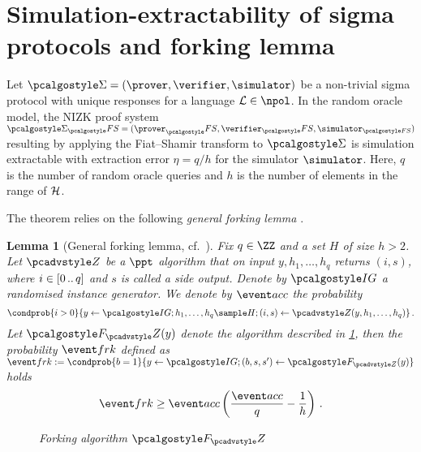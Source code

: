 \let\accentvec\vec \documentclass[runningheads]{llncs}
\newtheorem{lemma}[theorem]{Lemma}
\begin{document}
\section{Simulation-extractability of sigma protocols and forking lemma}
\label{sec:forking_lemma}
\begin{theorem}
	Let $\sigmaprot = (\prover, \verifier, \simulator)$ be a non-trivial sigma
  protocol with unique responses for a language $\LANG \in \npol$. In the random
  oracle model, the NIZK proof system $\sigmaprot_\fs = (\prover_\fs,
  \verifier_\fs, \simulator_{\fs})$ resulting by applying the Fiat--Shamir
  transform to $\sigmaprot$ is simulation extractable with extraction error
  $\eta = q/h$ for the simulator $\simulator$. Here, $q$ is the number of random
  oracle queries and $h$ is the number of elements in the range of $\mathcal{H}$.
\end{theorem}

The theorem relies on the following \emph{general forking lemma} \cite{JC:PoiSte00}.

\begin{lemma}[General forking lemma, cf.~\cite{INDOCRYPT:FKMV12,CCS:BelNev06}]
	\label{lem:forking_lemma}
	Fix $q \in \ZZ$ and a set $H$ of size $h > 2$. Let $\zdv$ be a $\ppt$
  algorithm that on input $y, h_1, \ldots, h_q$ returns $(i, s)$, where $i
  \in[0 \, .. \, q]$ and $s$ is called a \emph{side output}. Denote by $\ig$ a
  randomised instance generator. We denote by $\accProb$ the probability
	\[
		\condprob{i > 0}{y \gets \ig; h_1, \ldots, h_q \sample H; (i, s) \gets
		\zdv(y, h_1, \ldots, h_q)}\,.
	\]
	Let $\forking_\zdv(y)$ denote the algorithm described in
  \cref{fig:forking_lemma}, then the probability $\frkProb$ defined as $
  \frkProb := \condprob{b = 1}{y \gets \ig; (b, s, s') \gets \forking_{\zdv}(y)}
  $ holds
	\[
		\frkProb \geq \accProb \brak{\frac{\accProb}{q} - \frac{1}{h}}\,.
	\]
	\begin{figure}[t]
		\centering
		\caption{Forking algorithm $\forking_\zdv$}
		\label{fig:forking_lemma}
\end{figure}
\end{lemma}
\end{document}
